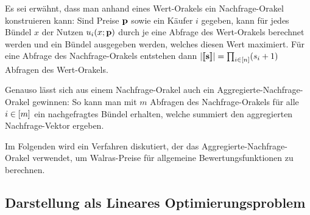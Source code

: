 Es sei erwähnt, dass man anhand eines Wert-Orakels ein Nachfrage-Orakel konstruieren kann:
Sind Preise $\mathbf{p}$ sowie ein Käufer $i$ gegeben, kann für jedes Bündel $x$ der Nutzen $u_i(x; \mathbf{p})$ durch je eine Abfrage des Wert-Orakels berechnet werden und ein Bündel ausgegeben werden, welches diesen Wert maximiert.
Für eine Abfrage des Nachfrage-Orakels entstehen dann $\left\lvert \left\llbracket \mathbf{s} \right\rrbracket \right\rvert = \prod_{i\in\left[ n \right]} (s_i + 1)$ Abfragen des Wert-Orakels.

Genauso lässt sich aus einem Nachfrage-Orakel auch ein Aggregierte-Nachfrage-Orakel gewinnen: So kann man mit $m$ Abfragen des Nachfrage-Orakels für alle $i\in\left[ m \right]$ ein nachgefragtes Bündel erhalten, welche summiert den aggregierten Nachfrage-Vektor ergeben.

Im Folgenden wird ein Verfahren diskutiert, der das Aggregierte-Nachfrage-Orakel verwendet, um Walras-Preise für allgemeine Bewertungsfunktionen zu berechnen.

\subsection{Darstellung als Lineares Optimierungsproblem}

